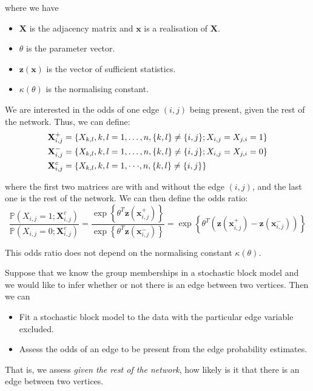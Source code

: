 \documentclass{article}
\begin{document}
where we have 
\begin{itemize}
    \item $\mathbf{X}$ is the adjacency matrix and $\mathbf{x}$ is a realisation of $\mathbf{X}$.
    \item $\theta$ is the parameter vector.
    \item $\mathbf{z}(\mathbf{x})$ is the vector of sufficient statistics.
    \item $\kappa(\theta)$ is the normalising constant.
\end{itemize}
We are interested in the odds of one edge $(i,j)$ being present, given the rest of the network. Thus, we can define:
\begin{align*}
    {\bf X}_{i,j}^{+}&=\{X_{k,l},k,l=1,\dots,n,\{k,l\}\neq\{i,j\};X_{i,j}=X_{j,i}=1\}\\
    {\bf X}_{i,j}^{-}&=\{X_{k,l},k,l=1,\dots,n,\{k,l\}\ne\{i,j\};X_{i,j}=X_{j,i}=0\}\\
    \mathbf{X}_{i,j}^{c}&=\{X_{k,l},k,l=1,\cdot\cdot\cdot,n,\{k,l\}\neq\{i,j\}\}
\end{align*}

where the first two matrices are with and without the edge $(i,j)$, and the last one is the rest of the network. We can then define the odds ratio:  
\begin{equation*}
    \frac{\mathbb{P}(X_{i,j}=1;\mathbf{X}_{i,j}^{c})}{\mathbb{P}(X_{i,j}=0;\mathbf{X}_{i,j}^{c})}=\frac{\exp\left\{\theta^{T}\mathbf{z}(\mathbf{x}_{i,j}^{+})\right\}}{\exp\left\{\theta^{T}\mathbf{z}(\mathbf{x}_{i,j}^{-})\right\}}=\exp\left\{\theta^{T}\left(\mathbf{z}(\mathbf{x}_{i,j}^{+})-\mathbf{z}(\mathbf{x}_{i,j}^{-})\right)\right\}
\end{equation*}

This odds ratio does not depend on the normalising constant $\kappa(\theta)$.

\begin{example}
Suppose that we know the group memberships in a stochastic block model and we would like to infer whether or not there is an edge between two vertices. Then we can
\begin{itemize}
    \item Fit a stochastic block model to the data with the particular edge variable excluded.
    \item Assess the odds of an edge to be present from the edge probability estimates.
\end{itemize}

That is, we assess \textit{given the rest of the network}, how likely is it that there is an edge between two vertices.  
\end{example}
\end{document}
